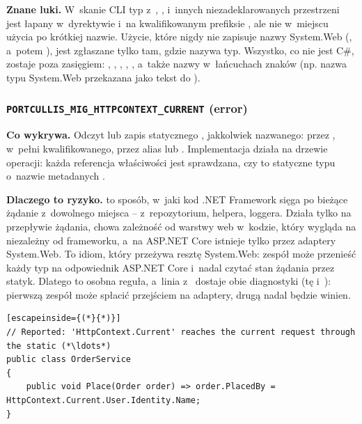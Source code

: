 \textbf{Znane luki.} W~skanie CLI typ z~, ,
 i~innych niezadeklarowanych przestrzeni jest łapany w~dyrektywie
 i~na kwalifikowanym prefiksie , ale nie w~miejscu
użycia po krótkiej nazwie. Użycie, które nigdy nie zapisuje nazwy System.Web
(, a~potem ), jest
zgłaszane tylko tam, gdzie  nazywa typ. Wszystko, co nie jest C\#, zostaje poza zasięgiem:
, , , ,
, a~także nazwy w~łańcuchach znaków (np. nazwa typu System.Web
przekazana jako tekst do ).

\subsubsection{\texttt{PORTCULLIS\_MIG\_HTTPCONTEXT\_CURRENT} (error)}

\textbf{Co wykrywa.} Odczyt lub zapis statycznego ,
jakkolwiek nazwanego: przez , w~pełni kwalifikowanego, przez
alias lub . Implementacja działa na drzewie operacji: każda
referencja właściwości jest sprawdzana, czy to statyczne  typu o~nazwie
metadanych .

\textbf{Dlaczego to ryzyko.}  to sposób, w~jaki kod
.NET Framework sięga po bieżące żądanie z~dowolnego miejsca -- z~repozytorium, helpera,
loggera. Działa tylko na przepływie żądania, chowa zależność od warstwy web w~kodzie, który
wygląda na niezależny od frameworku, a~na ASP.NET Core istnieje tylko przez adaptery
System.Web. To idiom, który przeżywa resztę System.Web: zespół może przenieść każdy typ na
odpowiednik ASP.NET Core i~nadal czytać stan żądania przez statyk. Dlatego to osobna reguła,
a~linia z~ dostaje obie diagnostyki (tę i~):
pierwszą zespół może spłacić przejściem na adaptery, drugą nadal będzie winien.

\begin{lstlisting}[escapeinside={(*}{*)}]
// Reported: 'HttpContext.Current' reaches the current request through the static (*\ldots*)
public class OrderService
{
    public void Place(Order order) => order.PlacedBy = HttpContext.Current.User.Identity.Name;
}
\end{lstlisting}

